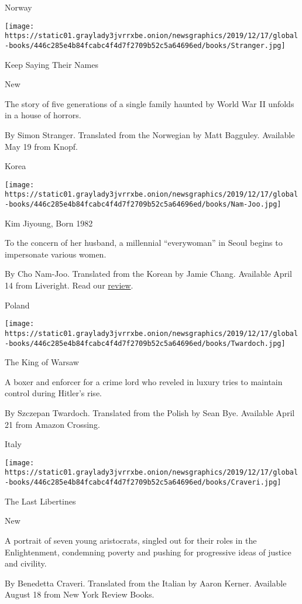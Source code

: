 Norway

\texttt{[image: https://static01.graylady3jvrrxbe.onion/newsgraphics/2019/12/17/global-books/446c285e4b84fcabc4f4d7f2709b52c5a64696ed/books/Stranger.jpg]}

Keep Saying Their Names

New

The story of five generations of a single family haunted by World War II
unfolds in a house of horrors.

 By Simon Stranger. Translated from the Norwegian by Matt Bagguley.
Available May 19 from Knopf.

Korea

\texttt{[image: https://static01.graylady3jvrrxbe.onion/newsgraphics/2019/12/17/global-books/446c285e4b84fcabc4f4d7f2709b52c5a64696ed/books/Nam-Joo.jpg]}

Kim Jiyoung, Born 1982

To the concern of her husband, a millennial ``everywoman'' in Seoul
begins to impersonate various women.

 By Cho Nam-Joo. Translated from the Korean by Jamie Chang. Available
April 14 from Liveright. Read our
\href{https://www.nytimes3xbfgragh.onion/2020/04/14/books/review/kim-jiyoung-born-1982-cho-nam-joo.html}{review}.

Poland

\texttt{[image: https://static01.graylady3jvrrxbe.onion/newsgraphics/2019/12/17/global-books/446c285e4b84fcabc4f4d7f2709b52c5a64696ed/books/Twardoch.jpg]}

The King of Warsaw

A boxer and enforcer for a crime lord who reveled in luxury tries to
maintain control during Hitler's rise.

 By Szczepan Twardoch. Translated from the Polish by Sean Bye. Available
April 21 from Amazon Crossing.

Italy

\texttt{[image: https://static01.graylady3jvrrxbe.onion/newsgraphics/2019/12/17/global-books/446c285e4b84fcabc4f4d7f2709b52c5a64696ed/books/Craveri.jpg]}

The Last Libertines

New

A portrait of seven young aristocrats, singled out for their roles in
the Enlightenment, condemning poverty and pushing for progressive ideas
of justice and civility.

 By Benedetta Craveri. Translated from the Italian by Aaron Kerner.
Available August 18 from New York Review Books.

